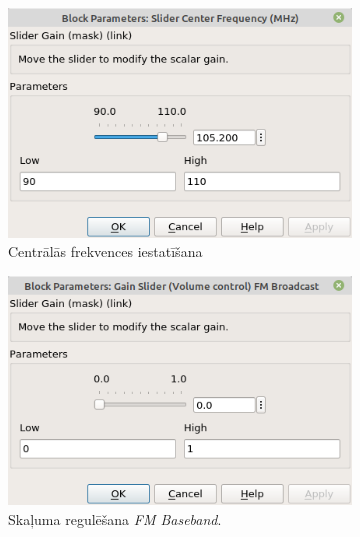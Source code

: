 \documentclass[a4paper,12pt]{extarticle}    %
\begin{document}
	\begin{figure}[H] %
	\centering
		\begin{subfigure}[t]{0.45\textwidth}
		\centering
		\includegraphics[trim={0cm 0cm 0cm 0cm},clip, angle=0, width=0.99\linewidth ]{pictures/fmslider.png}
		\caption{Centrālās frekvences iestatīšana}\label{fig:cf}
	\end{subfigure}
	\begin{subfigure}[t]{0.45\textwidth}
		\centering
		\includegraphics[trim={0cm 0cm 0cm 0cm},clip, angle=0, width=0.99\linewidth ]{pictures/gain1.png}
		\caption{Skaļuma regulēšana \textit{FM Baseband}.}\label{fig:volume1}
	\end{subfigure}
	\label{fig:pilseta_modulacija}
	\begin{subfigure}[t]{0.45\textwidth}
		\centering

\end{subfigure}
\end{figure}
\end{document}
